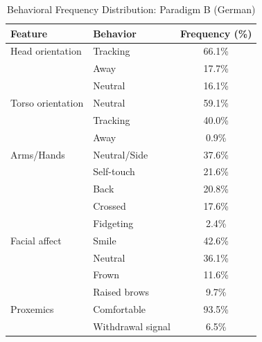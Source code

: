 \begin{table}[ht]
\centering
\caption{Behavioral Frequency Distribution: Paradigm B (German)}
\begin{tabular}{llc}
\toprule
Feature & Behavior & Frequency (\%) \\
\midrule
Head orientation & Tracking & 66.1\% \\
 & Away & 17.7\% \\
 & Neutral & 16.1\% \\
Torso orientation & Neutral & 59.1\% \\
 & Tracking & 40.0\% \\
 & Away & 0.9\% \\
Arms/Hands & Neutral/Side & 37.6\% \\
 & Self-touch & 21.6\% \\
 & Back & 20.8\% \\
 & Crossed & 17.6\% \\
 & Fidgeting & 2.4\% \\
Facial affect & Smile & 42.6\% \\
 & Neutral & 36.1\% \\
 & Frown & 11.6\% \\
 & Raised brows & 9.7\% \\
Proxemics & Comfortable & 93.5\% \\
 & Withdrawal signal & 6.5\% \\
\bottomrule
\end{tabular}
\end{table}